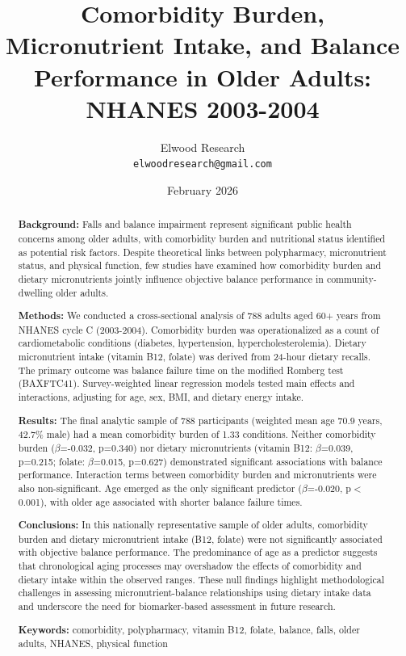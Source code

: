 \documentclass[11pt,a4paper]{article}
\title{\textbf{Comorbidity Burden, Micronutrient Intake, and Balance Performance in Older Adults:} \\ \textbf{NHANES 2003-2004}}
\author{Elwood Research\\
\texttt{elwoodresearch@gmail.com}}
\date{February 2026}
\begin{document}
\maketitle

\begin{abstract}
\noindent\textbf{Background:} Falls and balance impairment represent significant public health concerns among older adults, with comorbidity burden and nutritional status identified as potential risk factors. Despite theoretical links between polypharmacy, micronutrient status, and physical function, few studies have examined how comorbidity burden and dietary micronutrients jointly influence objective balance performance in community-dwelling older adults.

\noindent\textbf{Methods:} We conducted a cross-sectional analysis of 788 adults aged 60+ years from NHANES cycle C (2003-2004). Comorbidity burden was operationalized as a count of cardiometabolic conditions (diabetes, hypertension, hypercholesterolemia). Dietary micronutrient intake (vitamin B12, folate) was derived from 24-hour dietary recalls. The primary outcome was balance failure time on the modified Romberg test (BAXFTC41). Survey-weighted linear regression models tested main effects and interactions, adjusting for age, sex, BMI, and dietary energy intake.

\noindent\textbf{Results:} The final analytic sample of 788 participants (weighted mean age 70.9 years, 42.7\% male) had a mean comorbidity burden of 1.33 conditions. Neither comorbidity burden ($\beta$=-0.032, p=0.340) nor dietary micronutrients (vitamin B12: $\beta$=0.039, p=0.215; folate: $\beta$=0.015, p=0.627) demonstrated significant associations with balance performance. Interaction terms between comorbidity burden and micronutrients were also non-significant. Age emerged as the only significant predictor ($\beta$=-0.020, p$<$0.001), with older age associated with shorter balance failure times.

\noindent\textbf{Conclusions:} In this nationally representative sample of older adults, comorbidity burden and dietary micronutrient intake (B12, folate) were not significantly associated with objective balance performance. The predominance of age as a predictor suggests that chronological aging processes may overshadow the effects of comorbidity and dietary intake within the observed ranges. These null findings highlight methodological challenges in assessing micronutrient-balance relationships using dietary intake data and underscore the need for biomarker-based assessment in future research.

\vspace{0.3cm}
\noindent\textbf{Keywords:} comorbidity, polypharmacy, vitamin B12, folate, balance, falls, older adults, NHANES, physical function
\end{abstract}
\end{document}
